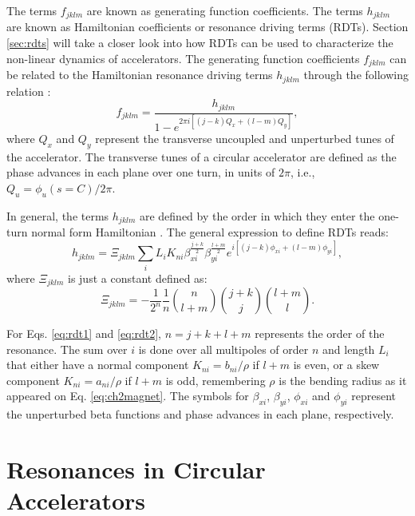 The terms $f_{jklm}$ are known as generating function coefficients. The terms $h_{jklm}$ are known as Hamiltonian coefficients or resonance driving terms (RDTs). Section \ref{sec:rdts} will take a closer look into how RDTs can be used to characterize the non-linear dynamics of accelerators. The generating function coefficients $f_{jklm}$ can be related to the Hamiltonian resonance driving terms $h_{jklm}$ through the following relation \cite{cernthesis1,bartolini}:
\begin{equation}
    \label{eq:handf}
    f_{jklm}=\frac{h_{jklm}}{1-e^{2\pi i \left[ \left( j-k \right) Q_x + \left( l-m\right) Q_y \right] }},
\end{equation}
where $Q_x$ and $Q_y$ represent the transverse uncoupled and unperturbed tunes of the accelerator. The transverse tunes of a circular accelerator are defined as the phase advances in each plane over one turn, in units of $2\pi$, i.e., $Q_u=\phi_u(s=C)/2\pi$. 

In general, the terms $h_{jklm}$ are defined by the order in which they enter the one-turn normal form Hamiltonian \cite{bartolini}. The general expression to define RDTs reads:
\begin{equation}
    \label{eq:rdt1}
    h_{jklm}=\Xi _{jklm} \sum_i L_i K_{ni} \beta_{xi}^{\frac{j+k}{2}} \beta_{yi}^{\frac{l+m}{2}} e^{i\left[ (j-k)\phi_{xi} +(l-m) \phi_{yi} \right]},
\end{equation}
where $\Xi _{jklm}$ is just a constant defined as:
\begin{equation}
    \label{eq:rdt2}
    \Xi _{jklm} = -\frac{1}{2^n}\frac{1}{n} {\binom{n}{l+m}} {\binom{j+k}{j}}{\binom{l+m}{l}}.
\end{equation}

For Eqs. \ref{eq:rdt1} and \ref{eq:rdt2}, $n=j+k+l+m$ represents the order of the resonance. The sum over $i$ is done over all multipoles of order $n$ and length $L_i$ that either have a normal component $K_{ni}=b_{ni}/\rho$ if $l+m$ is even, or a skew component $K_{ni}=a_{ni}/\rho$ if $l+m$ is odd, remembering $\rho$ is the bending radius as it appeared on Eq. \ref{eq:ch2magnet}. The symbols for $\beta_{xi}$, $\beta_{yi}$, $\phi_{xi}$ and $\phi_{yi}$ represent the unperturbed beta functions and phase advances in each plane, respectively.

\section{\label{sec:resonances}Resonances in Circular Accelerators}

